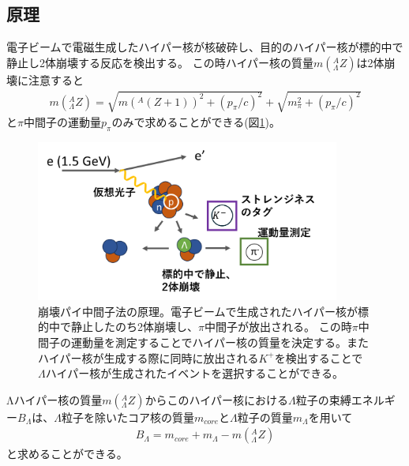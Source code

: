 \documentclass[a4paper,11pt,uplatex]{jsbook}
\begin{document}
\subsection{原理}\label{sec:dps principle}
電子ビームで電磁生成したハイパー核が核破砕し、目的のハイパー核が標的中で静止し2体崩壊する反応を検出する。
この時ハイパー核の質量$m(^A_{\Lambda}Z)$は2体崩壊に注意すると
\begin{eqnarray}
  m(^A_{\Lambda}Z) = \sqrt{m(^A(Z+1))^2 + (p_\pi/c)^2} + \sqrt{m_\pi^2 + (p_\pi/c)^2} \label{mass formula}
\end{eqnarray}
と$\pi$中間子の運動量$p_\pi$のみで求めることができる(図\ref{fig:DPS})。
\begin{figure}
  \centering
  \includegraphics[width=10cm]{image/1-DPS.png}
  \caption[崩壊パイ中間子法の原理]{崩壊パイ中間子法の原理。電子ビームで生成されたハイパー核が標的中で静止したのち2体崩壊し、$\pi$中間子が放出される。
  この時$\pi$中間子の運動量を測定することでハイパー核の質量を決定する。またハイパー核が生成する際に同時に放出される$K^+$を検出することで
  $\Lambda$ハイパー核が生成されたイベントを選択することができる。}\label{fig:DPS}
\end{figure}

Λハイパー核の質量$m(^A_\Lambda Z)$からこのハイパー核における$\Lambda$粒子の束縛エネルギー$B_\Lambda$は、$\Lambda$粒子を除いたコア核の質量$m_{core}$と$\Lambda$粒子の質量$m_\Lambda$を用いて
\begin{eqnarray}
  B_\Lambda = m_{core} + m_\Lambda - m(^A_\Lambda Z) \label{binding energy formula}
\end{eqnarray}
と求めることができる。
\end{document}
